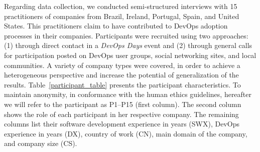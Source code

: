 

Regarding data collection, we conducted semi-structured interviews with 15 practitioners of companies from
Brazil, Ireland, Portugal, Spain, and United States. This practitioners claim
to have contributed to DevOps adoption processes in their companies. Participants
were recruited using two approaches: (1) through direct contact in a \emph{DevOps Days}
event and (2) through  general
calls for participation posted on DevOps user groups, social networking sites,
and local communities. A variety of company types were covered, in order to
achieve a heterogeneous perspective and increase the potential of generalization
of the results. Table~\ref{participant_table} presents the participant
characteristics.
To maintain anonymity, in conformance with the human ethics guidelines,
hereafter we will refer to the participant as P1--P15 (first column).
The second column shows the role of
each participant in her respective company. The remaining columns list their
software development experience in years (SWX), DevOps experience in years (DX),
country of work (CN), main domain of the company, and company size (CS).


